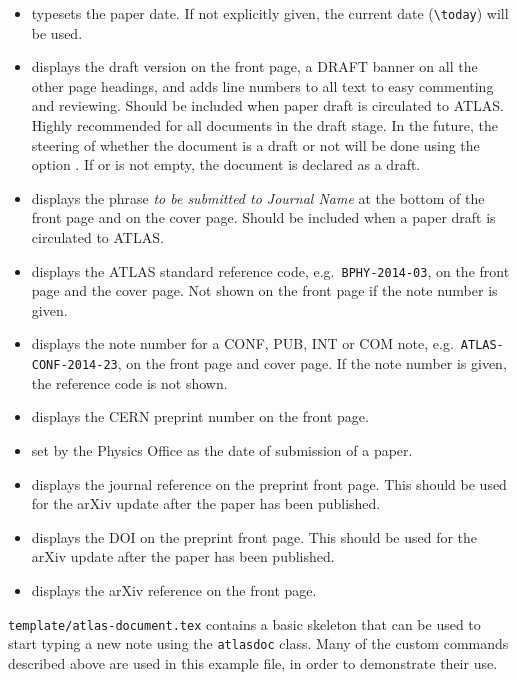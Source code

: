 \begin{itemize}
  \item {} typesets the paper date. If not
    explicitly given, the current date (\verb|\today|) will be used.

  \item {} displays the draft
    version on the front page, a DRAFT banner on all the other page
    headings, and adds line numbers to all text to easy commenting and
    reviewing.
    Should be included when paper draft is circulated to ATLAS.
    Highly recommended for all documents in the draft stage.
    In the future, the steering of whether the document is a draft or not will be done
    using the option .
     If  or  is not empty,
    the document is declared as a draft.

  \item {} displays the phrase \emph{to
    be submitted to Journal Name} at the bottom of the front page and
    on the cover page.
    Should be included when a paper draft is circulated to ATLAS.

  \item {} displays the ATLAS
    standard reference code, e.g.\ \texttt{BPHY-2014-03}, on the front page and
    the cover page. Not shown on the front page if the note number is given.

  \item {} displays the note number
    for a CONF, PUB, INT or COM note, e.g.\ \texttt{ATLAS-CONF-2014-23},
    on the front page and cover page.
    If the note number is given, the reference code is not shown.

  \item {} displays the CERN
    preprint number on the front page.
    
  \item {} set by the Physics Office as the date of submission of a paper.

  \item {} displays the journal reference
    on the preprint front page.
    This should be used for the arXiv update after the paper has been published.

  \item {} displays the DOI
    on the preprint front page.
    This should be used for the arXiv update after the paper has been published.

  \item {} displays the arXiv reference
    on the front page.

\end{itemize}
%
\texttt{template/atlas-document.tex} contains a basic skeleton that can be
used to start typing a new note using the \texttt{atlasdoc} class. Many of
the custom commands described above are used in this example file, in
order to demonstrate their use.

